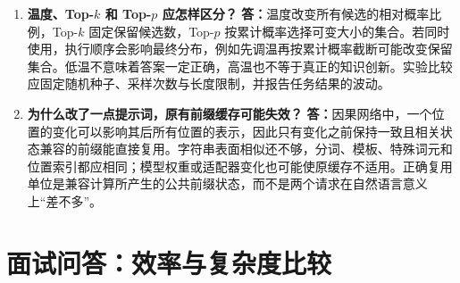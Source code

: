 \documentclass[UTF8,12pt,a4paper,fontset=fandol]{ctexart}
\begin{document}
\begin{enumerate}[resume*=trquestions]
\item \textbf{温度、Top-$k$ 和 Top-$p$ 应怎样区分？}
\textbf{答：}温度改变所有候选的相对概率比例，Top-$k$ 固定保留候选数，Top-$p$ 按累计概率选择可变大小的集合。若同时使用，执行顺序会影响最终分布，例如先调温再按累计概率截断可能改变保留集合。低温不意味着答案一定正确，高温也不等于真正的知识创新。实验比较应固定随机种子、采样次数与长度限制，并报告任务结果的波动。

\item \textbf{为什么改了一点提示词，原有前缀缓存可能失效？}
\textbf{答：}因果网络中，一个位置的变化可以影响其后所有位置的表示，因此只有变化之前保持一致且相关状态兼容的前缀能直接复用。字符串表面相似还不够，分词、模板、特殊词元和位置索引都应相同；模型权重或适配器变化也可能使原缓存不适用。正确复用单位是兼容计算所产生的公共前缀状态，而不是两个请求在自然语言意义上“差不多”。
\end{enumerate}

\section{面试问答：效率与复杂度比较}
\label{sec:tr-qa-efficiency}
\end{document}
